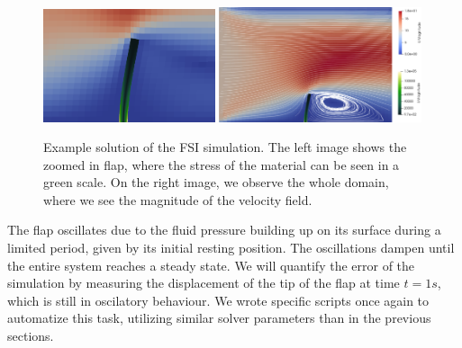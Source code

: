 \documentclass[
  english,        %
  font=times,     %
  onecolumn,      %
]{tumarticle}
\begin{document}
\begin{figure}[!ht]
    \centering
    \includegraphics[width=0.45\textwidth]{resources/FSI_small.png}
    \includegraphics[width=0.53\textwidth]{resources/FSI_big.png}
    \caption{Example solution of the FSI simulation. The left image shows the zoomed in flap, where the stress of the material can be seen in a green scale. On the right image, we observe the whole domain, where we see the magnitude of the velocity field.}
    \label{fig:FSI}
\end{figure}

The flap oscillates due to the fluid pressure building up on its surface during a limited period, given by its initial resting position. The oscillations dampen until the entire system reaches a steady state. We will quantify the error of the simulation by measuring the displacement of the tip of the flap at time $t=1s$, which is still in oscilatory behaviour. We wrote specific scripts once again to automatize this task, utilizing similar solver parameters than in the previous sections. 
\end{document}
